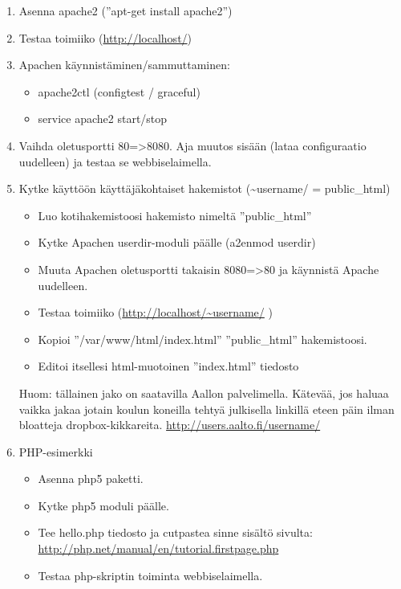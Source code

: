 \documentclass[12pt,portrait,a4]{article}
\begin{document}
\begin{enumerate}
\item Asenna apache2 (''apt-get install apache2'')
\item Testaa toimiiko (\url{http://localhost/})
\item Apachen käynnistäminen/sammuttaminen:
	\begin{itemize}
	\item apache2ctl (configtest / graceful)
	\item service apache2 start/stop
	\end{itemize}
\item Vaihda oletusportti 80=\textgreater 8080.  Aja muutos sisään (lataa configuraatio uudelleen) ja testaa se webbiselaimella.
\item Kytke käyttöön käyttäjäkohtaiset hakemistot (\textasciitilde username/ = public\_html)
	\begin{itemize}
	\item Luo kotihakemistoosi hakemisto nimeltä ''public\_html''
	\item Kytke Apachen userdir-moduli päälle (a2enmod userdir)
	\item Muuta Apachen oletusportti takaisin 8080=\textgreater 80 ja käynnistä Apache uudelleen.
	\item Testaa toimiiko (\url{http://localhost/~username/} )
	\item Kopioi ''/var/www/html/index.html'' ''public\_html'' hakemistoosi.
	\item Editoi itsellesi html-muotoinen ''index.html'' tiedosto
	\end{itemize}

Huom: tällainen jako on saatavilla Aallon palvelimella. Kätevää, jos haluaa vaikka jakaa jotain koulun koneilla tehtyä julkisella linkillä eteen päin ilman bloatteja dropbox-kikkareita.
\url{http://users.aalto.fi/username/}


\item PHP-esimerkki
	\begin{itemize}
	\item Asenna php5 paketti.
	\item Kytke php5 moduli päälle.
	\item Tee hello.php tiedosto ja cutpastea sinne sisältö sivulta:
\url{http://php.net/manual/en/tutorial.firstpage.php}
	\item Testaa php-skriptin toiminta webbiselaimella.
	\end{itemize}
\end{enumerate}
\end{document}
